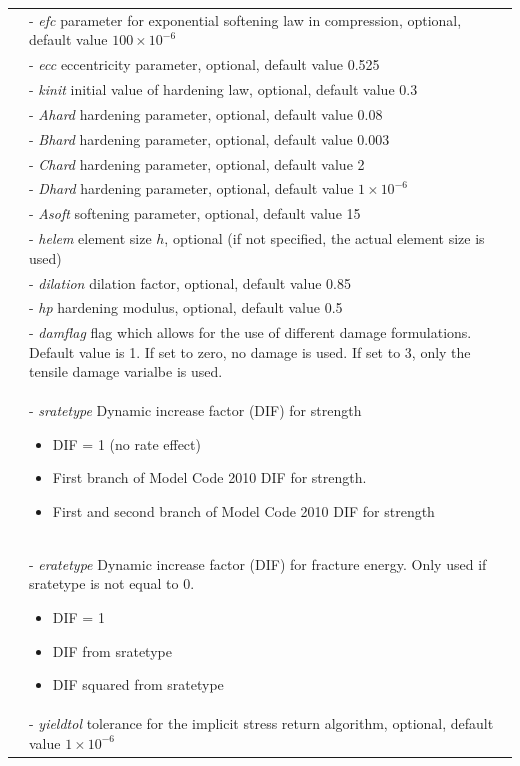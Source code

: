 \documentclass[a4paper]{article}
\newcommand{\param}[1]{{\it #1}}
\begin{document}
\begin{longtable}{|l|p{9cm}|}
&- \param{efc}  parameter for exponential softening law in compression, optional, default value $100 \times 10^{-6}$\\
&- \param{ecc} eccentricity parameter, optional, default value 0.525\\
&- \param{kinit} initial value of hardening law, optional, default value 0.3\\
&- \param{Ahard} hardening parameter, optional, default value 0.08\\
&- \param{Bhard} hardening parameter, optional, default value 0.003\\
&- \param{Chard} hardening parameter, optional, default value 2\\
&- \param{Dhard} hardening parameter, optional, default value $1\times 10^{-6}$\\
&- \param{Asoft} softening parameter, optional, default value 15\\
&- \param{helem} element size $h$, optional (if not specified, the actual element size is used)\\
&- \param{dilation} dilation factor, optional, default value 0.85\\
&- \param{hp} hardening modulus, optional, default value 0.5\\
&- \param{damflag} flag which allows for the use of different damage formulations. Default value is 1. If set to zero, no damage is used. If set to 3, only the tensile damage varialbe is used.\\
&- \param{sratetype}  Dynamic increase factor (DIF) for strength
\begin{itemize}\setlength{\itemsep}{-3pt}
\item[0 -] DIF = 1  (no rate effect)
\item[1 -] First branch of Model Code 2010 DIF for strength.
\item[2 -] First and second branch of Model Code 2010 DIF for strength
\end{itemize}\\
&- \param{eratetype} Dynamic increase factor (DIF) for fracture energy. Only used if sratetype is not equal to 0. 
\begin{itemize}\setlength{\itemsep}{-3pt}
\item[0 -] DIF = 1
\item[1 -] DIF from sratetype  
\item[2 -] DIF squared from sratetype
\end{itemize}\\
&- \param{yieldtol} tolerance for the implicit stress return algorithm, optional, default value $1 \times 10^{-6}$\\

\end{longtable}
\end{document}
